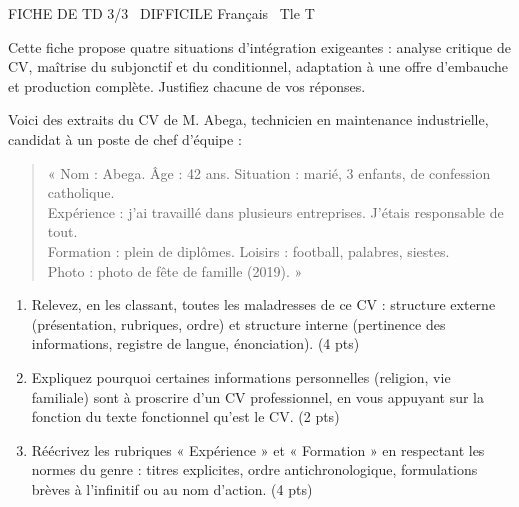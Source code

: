 \documentclass[11pt]{article}
\begin{document}
\begin{tcolorbox}[enhanced,colback=popink,colframe=popink,arc=10pt,boxrule=0pt,left=12pt,right=12pt,top=9pt,bottom=9pt]
{\color{white}\popxbold\small FICHE DE TD 3/3 \textbullet\ DIFFICILE \hfill Français \textbullet\ Tle T\par}
\end{tcolorbox}
\vspace{4pt}
Cette fiche propose quatre situations d'intégration exigeantes : analyse critique de CV, maîtrise du subjonctif et du conditionnel, adaptation à une offre d'embauche et production complète. Justifiez chacune de vos réponses.

\begin{exercice}
Voici des extraits du CV de M. Abega, technicien en maintenance industrielle, candidat à un poste de chef d'équipe :
\begin{quote}
« Nom : Abega. Âge : 42 ans. Situation : marié, 3 enfants, de confession catholique.\\
Expérience : j'ai travaillé dans plusieurs entreprises. J'étais responsable de tout.\\
Formation : plein de diplômes. Loisirs : football, palabres, siestes.\\
Photo : photo de fête de famille (2019). »
\end{quote}
\begin{enumerate}
\item Relevez, en les classant, toutes les maladresses de ce CV : structure externe (présentation, rubriques, ordre) et structure interne (pertinence des informations, registre de langue, énonciation). (4 pts)
\item Expliquez pourquoi certaines informations personnelles (religion, vie familiale) sont à proscrire d'un CV professionnel, en vous appuyant sur la fonction du texte fonctionnel qu'est le CV. (2 pts)
\item Réécrivez les rubriques « Expérience » et « Formation » en respectant les normes du genre : titres explicites, ordre antichronologique, formulations brèves à l'infinitif ou au nom d'action. (4 pts)
\end{enumerate}
\end{exercice}
\end{document}
